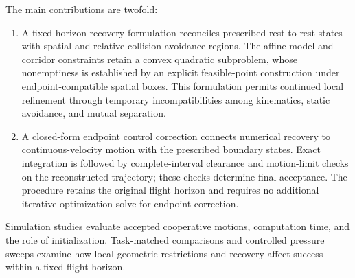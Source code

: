 The main contributions are twofold:
\begin{enumerate}
\item A fixed-horizon recovery formulation reconciles prescribed rest-to-rest states with spatial and relative collision-avoidance regions. The affine model and corridor constraints retain a convex quadratic subproblem, whose nonemptiness is established by an explicit feasible-point construction under endpoint-compatible spatial boxes. This formulation permits continued local refinement through temporary incompatibilities among kinematics, static avoidance, and mutual separation.
\item A closed-form endpoint control correction connects numerical recovery to continuous-velocity motion with the prescribed boundary states. Exact integration is followed by complete-interval clearance and motion-limit checks on the reconstructed trajectory; these checks determine final acceptance. The procedure retains the original flight horizon and requires no additional iterative optimization solve for endpoint correction.
\end{enumerate}
Simulation studies evaluate accepted cooperative motions, computation time, and the role of initialization. Task-matched comparisons and controlled pressure sweeps examine how local geometric restrictions and recovery affect success within a fixed flight horizon.
